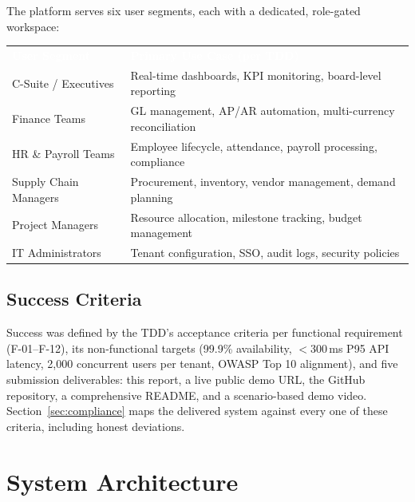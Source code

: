 \documentclass[11pt,a4paper]{article}
\begin{document}
The platform serves six user segments, each with a dedicated, role-gated workspace:

\begin{table}[H]
\centering\small
\renewcommand{\arraystretch}{1.3}
\begin{tabularx}{\textwidth}{l X}
\toprule
\rowcolor{amdoxnavy} \textcolor{white}{\textbf{User Segment}} & \textcolor{white}{\textbf{Primary Use Case (per TDD)}} \\
C-Suite / Executives   & Real-time dashboards, KPI monitoring, board-level reporting \\
\rowcolor{amdoxlight}
Finance Teams          & GL management, AP/AR automation, multi-currency reconciliation \\
HR \& Payroll Teams    & Employee lifecycle, attendance, payroll processing, compliance \\
\rowcolor{amdoxlight}
Supply Chain Managers  & Procurement, inventory, vendor management, demand planning \\
Project Managers       & Resource allocation, milestone tracking, budget management \\
\rowcolor{amdoxlight}
IT Administrators      & Tenant configuration, SSO, audit logs, security policies \\
\bottomrule
\end{tabularx}
\end{table}

\subsection{Success Criteria}

Success was defined by the TDD's acceptance criteria per functional requirement
(F-01--F-12), its non-functional targets (99.9\% availability, $<$300\,ms P95 API
latency, 2{,}000 concurrent users per tenant, OWASP Top 10 alignment), and five
submission deliverables: this report, a live public demo URL, the GitHub repository,
a comprehensive README, and a scenario-based demo video. Section~\ref{sec:compliance}
maps the delivered system against every one of these criteria, including honest
deviations.

\section{System Architecture}\label{sec:architecture}
\end{document}
